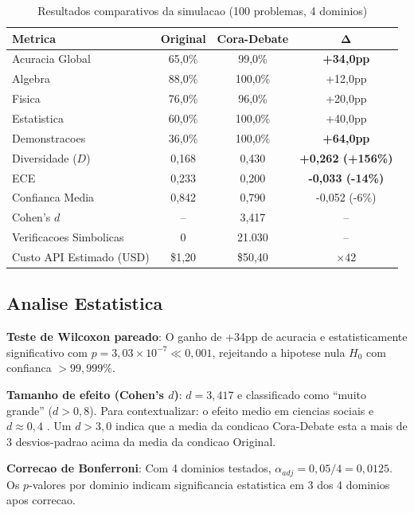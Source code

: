 \documentclass[5p]{elsarticle}
\begin{document}
\begin{table}[H]
  \centering
  \caption{Resultados comparativos da simulacao (100 problemas, 4 dominios)}
  \label{tab:results}
  \begin{tabular}{lccc}
    \toprule
    \textbf{Metrica} & \textbf{Original} & \textbf{Cora-Debate} & $\mathbf{\Delta}$ \\
    \midrule
    Acuracia Global & 65,0\% & 99,0\% & \textbf{+34,0pp} \\
    \quad Algebra & 88,0\% & 100,0\% & +12,0pp \\
    \quad Fisica & 76,0\% & 96,0\% & +20,0pp \\
    \quad Estatistica & 60,0\% & 100,0\% & +40,0pp \\
    \quad Demonstracoes & 36,0\% & 100,0\% & \textbf{+64,0pp} \\
    Diversidade ($D$) & 0,168 & 0,430 & \textbf{+0,262 (+156\%)} \\
    ECE & 0,233 & 0,200 & \textbf{-0,033 (-14\%)} \\
    Confianca Media & 0,842 & 0,790 & -0,052 (-6\%) \\
    Cohen's $d$ & -- & 3,417 & -- \\
    Verificacoes Simbolicas & 0 & 21.030 & -- \\
    Custo API Estimado (USD) & \$1,20 & \$50,40 & $\times 42$ \\
    \bottomrule
  \end{tabular}
\end{table}

\subsection{Analise Estatistica}

\textbf{Teste de Wilcoxon pareado}: O ganho de +34pp de acuracia e estatisticamente significativo com $p = 3,03 \times 10^{-7} \ll 0,001$, rejeitando a hipotese nula $H_0$ com confianca $> 99,999\%$.

\textbf{Tamanho de efeito (Cohen's $d$)}: $d = 3,417$ e classificado como ``muito grande'' ($d > 0,8$). Para contextualizar: o efeito medio em ciencias sociais e $d \approx 0,4$ \cite{cohen1988}. Um $d > 3,0$ indica que a media da condicao Cora-Debate esta a mais de 3 desvios-padrao acima da media da condicao Original.

\textbf{Correcao de Bonferroni}: Com 4 dominios testados, $\alpha_{adj} = 0,05 / 4 = 0,0125$. Os $p$-valores por dominio indicam significancia estatistica em 3 dos 4 dominios apos correcao.
\end{document}
